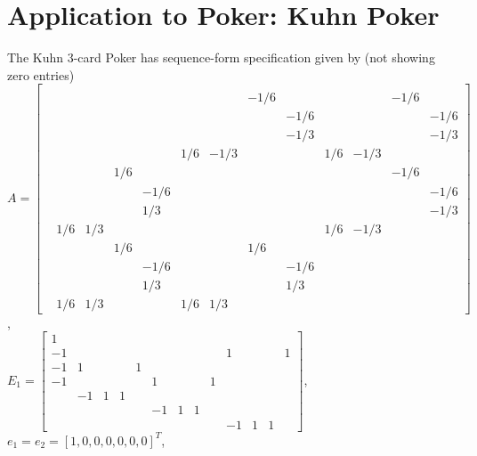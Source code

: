 \documentclass{article} %
\begin{document}
\section{Application to Poker: Kuhn Poker}
The Kuhn 3-card Poker has sequence-form specification given by (not showing zero entries)\\
$A = \left[\begin{array}{ccccccccccccc}
  &   &   &   &   &   &   &   &   &   &   &   &  \\
  &   &   &   &   &   &   & -1 / 6 &   &   &   & -1 / 6 &  \\
  &   &   &   &   &   &   &   & -1 / 6 &   &   &   & -1 / 6\\
  &   &   &   &   &   &   &   & -1 / 3 &   &   &   & -1 / 3\\
  &   &   &   &   & 1 / 6 & -1 / 3 &   &   & 1 / 6 & -1 / 3 &   &  \\
  &   &   & 1 / 6 &   &   &   &   &   &   &   & -1 / 6 &  \\
  &   &   &   & -1 / 6 &   &   &   &   &   &   &   & -1 / 6\\
  &   &   &   & 1 / 3 &   &   &   &   &   &   &   & -1 / 3\\
  & 1 / 6 & 1 / 3 &   &   &   &   &   &   & 1 / 6 & -1 / 3 &   &  \\
  &   &   & 1 / 6 &   &   &   & 1 / 6 &   &   &   &   &  \\
  &   &   &   & -1 / 6 &   &   &   & -1 / 6 &   &   &   &  \\
  &   &   &   & 1 / 3 &   &   &   & 1 / 3 &   &   &   &  \\
  & 1 / 6 & 1 / 3 &   &   & 1 / 6 & 1 / 3 &   &   &   &   &   &  
\end{array}\right]$,\\
$E_1 = \left[\begin{array}{ccccccccccccc}
1 &   &   &   &   &   &   &   &   &   &   &   &  \\
-1 &   &   &   &   &   &   &   &   & 1 &   &   & 1\\
-1 & 1 &   &   & 1 &   &   &   &   &   &   &   &  \\
-1 &   &   &   &   & 1 &   &   & 1 &   &   &   &  \\
  & -1 & 1 & 1 &   &   &   &   &   &   &   &   &  \\
  &   &   &   &   & -1 & 1 & 1 &   &   &   &   &  \\
  &   &   &   &   &   &   &   &   & -1 & 1 & 1 &  
\end{array}\right]$, $e_1 = e_2 = [1, 0, 0, 0, 0, 0, 0]^T$,\\
\end{document}
